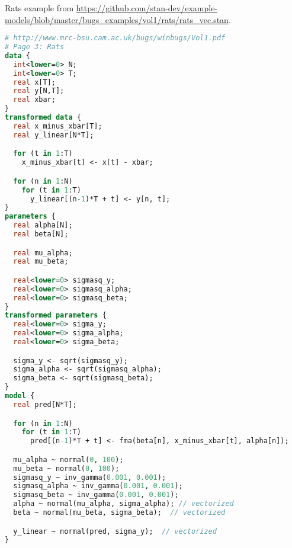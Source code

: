 \documentclass{article}
\begin{document}
Rats example from \url{https://github.com/stan-dev/example-models/blob/master/bugs_examples/vol1/rats/rats_vec.stan}.

\begin{lstlisting}[language=Stan]
# http://www.mrc-bsu.cam.ac.uk/bugs/winbugs/Vol1.pdf
# Page 3: Rats
data {
  int<lower=0> N;
  int<lower=0> T;
  real x[T];
  real y[N,T];
  real xbar;
}
transformed data {
  real x_minus_xbar[T];
  real y_linear[N*T];

  for (t in 1:T)
    x_minus_xbar[t] <- x[t] - xbar;

  for (n in 1:N)
    for (t in 1:T)
      y_linear[(n-1)*T + t] <- y[n, t];
}
parameters {
  real alpha[N];
  real beta[N];

  real mu_alpha;
  real mu_beta;

  real<lower=0> sigmasq_y;
  real<lower=0> sigmasq_alpha;
  real<lower=0> sigmasq_beta;
}
transformed parameters {
  real<lower=0> sigma_y;
  real<lower=0> sigma_alpha;
  real<lower=0> sigma_beta;

  sigma_y <- sqrt(sigmasq_y);
  sigma_alpha <- sqrt(sigmasq_alpha);
  sigma_beta <- sqrt(sigmasq_beta);
}
model {
  real pred[N*T];

  for (n in 1:N)
    for (t in 1:T)
      pred[(n-1)*T + t] <- fma(beta[n], x_minus_xbar[t], alpha[n]);

  mu_alpha ~ normal(0, 100);
  mu_beta ~ normal(0, 100);
  sigmasq_y ~ inv_gamma(0.001, 0.001);
  sigmasq_alpha ~ inv_gamma(0.001, 0.001);
  sigmasq_beta ~ inv_gamma(0.001, 0.001);
  alpha ~ normal(mu_alpha, sigma_alpha); // vectorized
  beta ~ normal(mu_beta, sigma_beta);  // vectorized

  y_linear ~ normal(pred, sigma_y);  // vectorized
}
\end{lstlisting}
\end{document}

